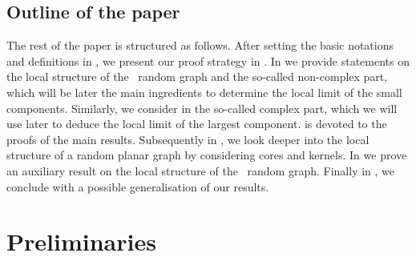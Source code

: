\subsection{Outline of the paper} 
The rest of the paper is structured as follows. After setting the basic notations and definitions in , we present our proof strategy in . In  we provide statements on the local structure of the \ER\ random graph and the so-called non-complex part, which will be later the main ingredients to determine the local limit of the small components. Similarly, we consider in  the so-called complex part, which we will use later to deduce the local limit of the largest component.  is devoted to the proofs of the main results. Subsequently in , we look deeper into the local structure of a random planar graph by considering cores and kernels. In  we prove an auxiliary result on the local structure of the \ER\ random graph. Finally in , we conclude with a possible generalisation of our results.

\section{Preliminaries}\label{LSsec:prelim}
